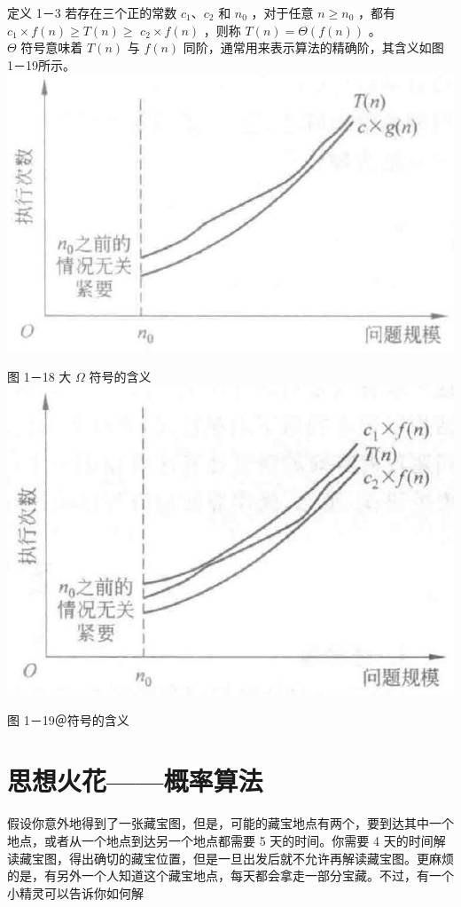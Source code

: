 \documentclass[10pt]{article}
\begin{document}
定义 1－3 若存在三个正的常数 $c_{1} 、 c_{2}$ 和 $n_{0}$ ，对于任意 $n \geqslant n_{0}$ ，都有 $c_{1} \times f(n) \geqslant T(n) \geqslant$ $c_{2} \times f(n)$ ，则称 $T(n)=\Theta(f(n))$ 。\\
$\Theta$ 符号意味着 $T(n)$ 与 $f(n)$ 同阶，通常用来表示算法的精确阶，其含义如图 1－19所示。\\
\includegraphics[max width=\textwidth, center]{2025_06_06_704745ea57b15b2333e5g-036}

图 1－18 大 $\Omega$ 符号的含义\\
\includegraphics[max width=\textwidth, center]{2025_06_06_704745ea57b15b2333e5g-036(1)}

图 1－19＠符号的含义

\section*{思想火花——概率算法}
假设你意外地得到了一张藏宝图，但是，可能的藏宝地点有两个，要到达其中一个地点，或者从一个地点到达另一个地点都需要 5 天的时间。你需要 4 天的时间解读藏宝图，得出确切的藏宝位置，但是一旦出发后就不允许再解读藏宝图。更麻烦的是，有另外一个人知道这个藏宝地点，每天都会拿走一部分宝藏。不过，有一个小精灵可以告诉你如何解
\end{document}
